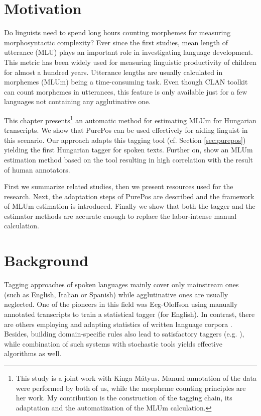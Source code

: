 
\section{Motivation}

Do linguists need to spend long hours counting morphemes for measuring morphosyntactic complexity? 
Ever since the first studies, mean length of utterance (MLU) plays an important role in investigating language development. 
This metric has been widely used for measuring linguistic productivity of children for almost a hundred years. 
Utterance lengths are usually calculated in morphemes (MLUm) being a time-consuming task. 
Even though CLAN toolkit can count morphemes in utterances, this feature is only available just for a few languages not containing any agglutinative one.

This chapter presents\footnote{This study is a joint work with Kinga Mátyus. 
Manual annotation of the data were performed by both of us, while the morpheme counting principles are her work. 
My contribution is the construction of the tagging chain, its adaptation and the automatization of the MLUm calculation.} 
an automatic method for estimating MLUm for Hungarian transcripts. 
We show that PurePos can be used effectively for aiding linguist in this scenario. 
Our approach adapts this tagging tool (cf. Section \ref{sec:purepos}) yielding the first Hungarian tagger for spoken texts. 
Further on, show an MLUm estimation method based on the tool resulting in high correlation with the result of human annotators. 

First we summarize related studies, then we present resources used for the research. 
Next, the adaptation steps of PurePos are described and the framework of MLUm estimation is introduced. 
Finally we show that both the tagger and the estimator methods are accurate enough to replace the labor-intense manual calculation.

\section{Background}

Tagging approaches of spoken languages mainly cover only mainstream ones (such as English, Italian or Spanish) while agglutinative ones are usually neglected. 
One of the pioneers in this field was Eeg-Oloffson \cite{Svartvik1982} using  manually annotated transcripts to train a statistical tagger (for English). 
In contrast, there are others employing and adapting statistics of written language corpora \cite{Mendes2004,Nivre1996,Panunzi2004}.
Besides, building domain-specific rules also lead to satisfactory taggers (e.g. \cite{Moreno2003}),
while combination of such systems with stochastic tools \cite{Bick2012} yields effective algorithms as well. 

